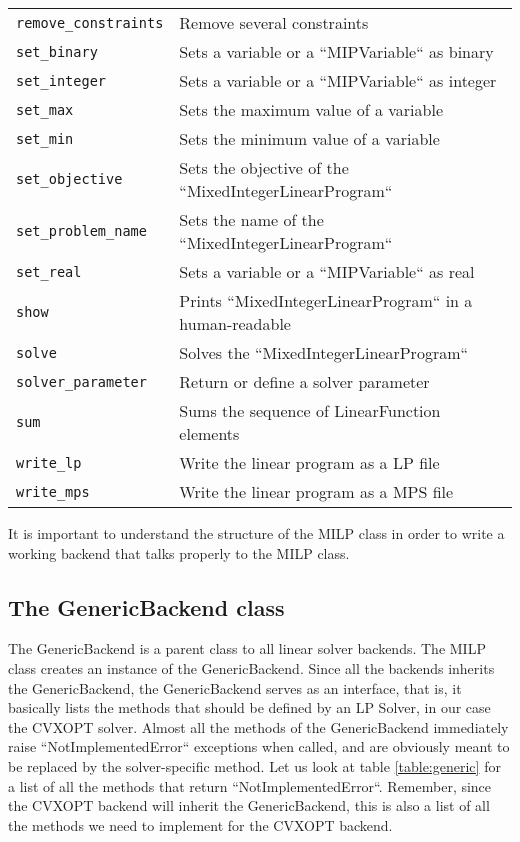 \begin{table}
\begin{center}
\begin{tabular}{ | l |  l |}
\texttt{remove\_constraints}&         Remove several constraints\\
\texttt{set\_binary}&                 Sets a variable or a ``MIPVariable`` as binary\\
\texttt{set\_integer}&                Sets a variable or a ``MIPVariable`` as integer\\
\texttt{set\_max}&                    Sets the maximum value of a variable\\
\texttt{set\_min}&                    Sets the minimum value of a variable\\
\texttt{set\_objective}&              Sets the objective of the ``MixedIntegerLinearProgram``\\
\texttt{set\_problem\_name}&           Sets the name of the ``MixedIntegerLinearProgram``\\
\texttt{set\_real}&                   Sets a variable or a ``MIPVariable`` as real\\
\texttt{show}&                       Prints ``MixedIntegerLinearProgram`` in a human-readable\\
\texttt{solve}&                      Solves the ``MixedIntegerLinearProgram``\\
\texttt{solver\_parameter}&           Return or define a solver parameter\\
\texttt{sum}&                         Sums the sequence of LinearFunction elements\\
\texttt{write\_lp}&                   Write the linear program as a LP file\\
\texttt{write\_mps}&                  Write the linear program as a MPS file\\
    \hline
  \end{tabular}
\end{center}
\end{table}

It is important to understand the structure of the MILP class in order to write a working backend that talks properly to the MILP class. 



\subsection{The GenericBackend class}
The GenericBackend is a parent class to all linear solver backends. The MILP class creates an instance of the GenericBackend. Since all the backends inherits the GenericBackend, the GenericBackend serves as an interface, that is, it basically lists the methods that should be defined by an LP Solver, in our case the CVXOPT solver. Almost all the methods of the GenericBackend immediately raise ``NotImplementedError`` exceptions when called, and are obviously meant to be replaced by the solver-specific method. Let us look at table \ref{table:generic} for a list of all the methods that return ``NotImplementedError``. Remember, since the CVXOPT backend will inherit the GenericBackend, this is also a list of all the methods we need to implement for the CVXOPT backend.

